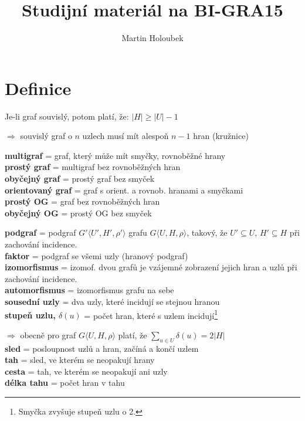 \documentclass[12pt]{article}
\title{Studijní materiál na BI-GRA15}
\author{Martin Holoubek}
\begin{document}
\maketitle
\cleardoublepage


\section{Definice}
\noindent
Je-li graf souvislý, potom platí, že: $\left| H \right| \geq \left| U \right| - 1$

$\Rightarrow$ souvislý graf o $n$ uzlech musí mít alespoň $n-1$ hran (kružnice)


\noindent
\textbf{multigraf} = graf, který může mít smyčky, rovnoběžné hrany\\
\textbf{prostý graf} = multigraf bez rovnoběžných hran\\
\textbf{obyčejný graf} = prostý graf bez smyček\\

\noindent
\textbf{orientovaný graf} = graf s orient. a rovnob. hranami a smyčkami\\
\textbf{prostý OG} = graf bez rovnoběžných hran \\
\textbf{obyčejný OG} = prostý OG bez smyček

\noindent
\textbf{podgraf} = podgraf $G'\langle U', H', \rho'\rangle$ grafu $G\langle U, H, \rho\rangle$, takový, že $U' \subseteq U$, $H' \subseteq H$ při zachování incidence.\\
\textbf{faktor} = podgraf se všemi uzly (hranový podgraf)\\
\textbf{izomorfismus} = izomof. dvou grafů je vzájemné zobrazení jejich hran a uzlů při zachování incidence.\\
\textbf{automorfismus} = izomorfismus grafu na sebe\\

\noindent
\textbf{sousední uzly} = dva uzly, které incidují se stejnou hranou\\
\textbf{stupeň uzlu, $\delta(u)$} = počet hran, které s uzlem incidují\footnote{Smyčka zvyšuje stupeň uzlu o 2.}

$\Rightarrow$ obecně pro graf $G\langle U, H, \rho\rangle$ platí, že $\displaystyle \sum_{u\in U} \delta(u) = 2\left| H\right|$\\

\noindent
\textbf{sled} = posloupnost uzlů a hran, začíná a končí uzlem\\
\textbf{tah} = sled, ve kterém se neopakují hrany\\
\textbf{cesta} = tah, ve kterém se neopakují ani uzly\\
\textbf{délka tahu} = počet hran v tahu\\
\end{document}
